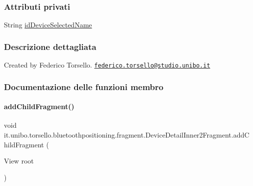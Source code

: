 \subsubsection*{Attributi privati}
\begin{DoxyCompactItemize}
\item 
String \hyperlink{classit_1_1unibo_1_1torsello_1_1bluetoothpositioning_1_1fragment_1_1DeviceDetailInner2Fragment_a84cd6ba00a3c2e8b7a53cac62c73f1b5_a84cd6ba00a3c2e8b7a53cac62c73f1b5}{id\+Device\+Selected\+Name}
\end{DoxyCompactItemize}


\subsubsection{Descrizione dettagliata}
Created by Federico Torsello. \href{mailto:federico.torsello@studio.unibo.it}{\tt federico.\+torsello@studio.\+unibo.\+it} 

\subsubsection{Documentazione delle funzioni membro}
\hypertarget{classit_1_1unibo_1_1torsello_1_1bluetoothpositioning_1_1fragment_1_1DeviceDetailInner2Fragment_af61900b6821dff2086e86d646c990870_af61900b6821dff2086e86d646c990870}{}\label{classit_1_1unibo_1_1torsello_1_1bluetoothpositioning_1_1fragment_1_1DeviceDetailInner2Fragment_af61900b6821dff2086e86d646c990870_af61900b6821dff2086e86d646c990870} 
\paragraph{\texorpdfstring{add\+Child\+Fragment()}{addChildFragment()}}
{\footnotesize\ttfamily void it.\+unibo.\+torsello.\+bluetoothpositioning.\+fragment.\+Device\+Detail\+Inner2\+Fragment.\+add\+Child\+Fragment (\begin{DoxyParamCaption}\item[{View}]{root }\end{DoxyParamCaption})\hspace{0.3cm}{\ttfamily [private]}}


